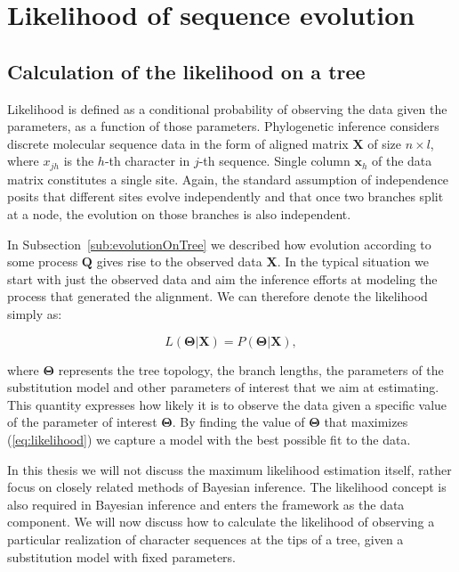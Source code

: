 \section{Likelihood of sequence evolution}

\subsection{Calculation of the likelihood on a tree\label{sub:likelihood}}

Likelihood is defined as a conditional probability of observing the data given the parameters, as a function of those parameters.
Phylogenetic inference considers discrete molecular sequence data in the form of aligned matrix $\mathbf{X}$ of size $n \times l$, where $x_{jh}$ is the $h$-th character in $j$-th sequence.
Single column $\mathbf{x}_{h}$ of the data matrix constitutes a single site.
Again, the standard assumption of independence posits that different sites evolve independently and that once two branches split at a node, the evolution on those branches is also independent.

In Subsection~\ref{sub:evolutionOnTree} we described how evolution according to some process $\mathbf{Q}$ gives rise to the observed data $\mathbf{X}$.
In the typical situation we start with just the observed data and aim the inference efforts at modeling the process that generated the alignment.
We can therefore denote the likelihood simply as: 

\begin{equation}
L\left(\mathbf{\Theta}|\mathbf{X}\right)=P\left(\mathbf{\Theta}|\mathbf{X}\right), 
\label{eq:likelihood}
\end{equation}

\noindent
where $\mathbf{\Theta}$ represents the tree topology, the branch lengths, the parameters of the substitution model and other parameters of interest that we aim at estimating.
This quantity expresses how likely it is to observe the data given a specific value of the parameter of interest $\mathbf{\Theta}$.
By finding the value of $\mathbf{\Theta}$ that maximizes (\ref{eq:likelihood}) we capture a model with the best possible fit to the data.

In this thesis we will not discuss the maximum likelihood estimation itself, %
rather focus on closely related 
methods of Bayesian inference.
The likelihood concept is also required in Bayesian inference and enters the framework as the data component.
We will now discuss how to calculate the likelihood of observing a particular realization of character sequences at the tips of a tree, given a substitution model with fixed parameters.

